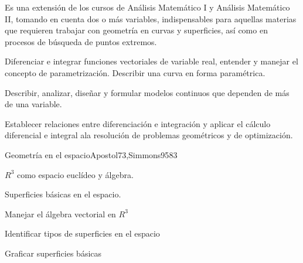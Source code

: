 



\begin{syllabus}


\begin{justification}
Es una extensión de los cursos de Análisis Matemático I y Análisis Matemático II, tomando en cuenta dos o más variables, indispensables para aquellas materias que requieren trabajar con geometría en curvas y superficies, así­ como en procesos de búsqueda de puntos extremos.
\end{justification}

\begin{goals}
\item Diferenciar e integrar funciones vectoriales de variable real, entender y manejar el concepto de parametrización. Describir una curva en forma paramétrica.
\item Describir, analizar, diseñar y formular modelos continuos que dependen de más de una variable.
\item Establecer relaciones entre diferenciación e integración y aplicar el cálculo diferencial e integral ala resolución de problemas geométricos y de optimización.
\end{goals}

\begin{outcomes}
\end{outcomes}

\begin{unit}{Geometría en el espacio}{Apostol73,Simmons95}{8}{3}
   \begin{topics}
      \item $R^3$ como espacio euclídeo y álgebra.
      \item Superficies básicas en el espacio.
   \end{topics}

   \begin{unitgoals}
      \item Manejar el álgebra vectorial en $R^3$
      \item Identificar tipos de superficies en el espacio
      \item Graficar superficies básicas
      \end{unitgoals}
\end{unit}


\end{syllabus}
